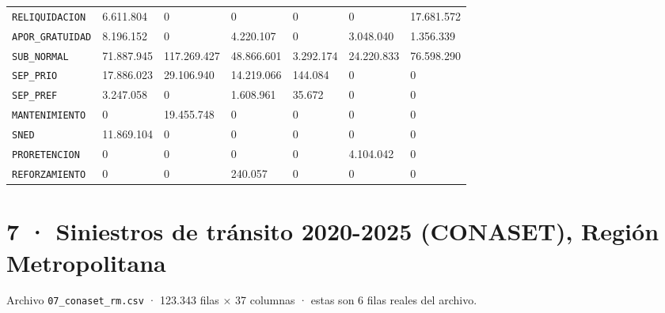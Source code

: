 \documentclass[10pt]{article}
\begin{document}
\begin{xltabular}{\linewidth}{@{}p{4.3cm} Y Y Y Y Y Y @{}}
\texttt{RELIQUIDACION} & 6.611.804 & 0 & 0 & 0 & 0 & 17.681.572 \\
\texttt{APOR\_\allowbreak{}GRATUIDAD} & 8.196.152 & 0 & 4.220.107 & 0 & 3.048.040 & 1.356.339 \\
\texttt{SUB\_\allowbreak{}NORMAL} & 71.887.945 & 117.269.427 & 48.866.601 & 3.292.174 & 24.220.833 & 76.598.290 \\
\texttt{SEP\_\allowbreak{}PRIO} & 17.886.023 & 29.106.940 & 14.219.066 & 144.084 & 0 & 0 \\
\texttt{SEP\_\allowbreak{}PREF} & 3.247.058 & 0 & 1.608.961 & 35.672 & 0 & 0 \\
\texttt{MANTENIMIENTO} & 0 & 19.455.748 & 0 & 0 & 0 & 0 \\
\texttt{SNED} & 11.869.104 & 0 & 0 & 0 & 0 & 0 \\
\texttt{PRORETENCION} & 0 & 0 & 0 & 0 & 4.104.042 & 0 \\
\texttt{REFORZAMIENTO} & 0 & 0 & 240.057 & 0 & 0 & 0 \\
\end{xltabular}
\normalsize

\clearpage
\hypertarget{base7}{}
\section{7 · Siniestros de tránsito 2020-{}2025 (CONASET), Región Metropolitana}
\small Archivo \texttt{07\_conaset\_rm.csv} · 123.343 filas × 37 columnas · estas son 6 filas reales del archivo.\normalsize
\end{document}
